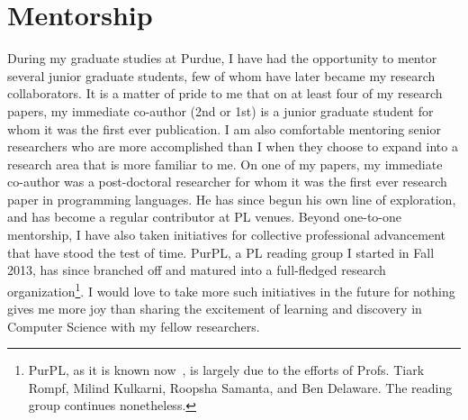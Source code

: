 \section*{Mentorship}

During my graduate studies at Purdue, I have had the opportunity to
mentor several junior graduate students, few of whom have later became
my research collaborators. It is a matter of pride to me that on at
least four of my research papers, my immediate co-author (2nd or 1st)
is a junior graduate student for whom it was the first ever
publication. I am also comfortable mentoring senior researchers who
are more accomplished than I when they choose to expand into a
research area that is more familiar to me. On one of my papers, my
immediate co-author was a post-doctoral researcher for whom it was the
first ever research paper in programming languages. He has since begun
his own line of exploration, and has become a regular contributor at
PL venues. Beyond one-to-one mentorship, I have also taken initiatives
for collective professional advancement that have stood the test of
time. PurPL, a PL reading group I started in Fall 2013, has since
branched off and matured into a full-fledged research
organization\footnote{ PurPL, as it is known now~\cite{purpl}, is
  largely due to the efforts of Profs. Tiark Rompf, Milind Kulkarni,
  Roopsha Samanta, and Ben Delaware. The reading group continues
  nonetheless.}. I would love to take more such initiatives in the
future for nothing gives me more joy than sharing the excitement of
learning and discovery in Computer Science with my fellow researchers.
